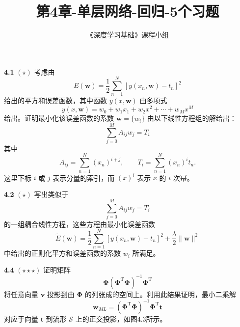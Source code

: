 \documentclass{article}
\title{第4章-单层网络-回归-5个习题}
\author{《深度学习基础》课程小组}
\begin{document}
\maketitle

\textbf{4.1} $(\star)$ 考虑由
\begin{equation}
E(\mathbf{w}) = \frac{1}{2} \sum\limits_{n=1}^{N} \left[ y(x_n,\mathbf{w})-t_n \right]^2
\tag{1.2}
\end{equation}
给出的平方和误差函数，其中函数 $y(x, \mathbf{w})$ 由多项式
\begin{equation}
y(x, \mathbf{w}) = w_0 + w_1x_1 + w_2x^2 + \cdots + w_Mx^M 
\tag{1.1}
\end{equation}
给出。证明最小化该误差函数的系数 $\mathbf{w} = \{w_i\}$ 由以下线性方程组的解给出：
\begin{equation}
\sum_{j=0}^{M} A_{ij} w_j = T_i \tag{4.53}
\end{equation}
其中
\begin{equation}
A_{ij} = \sum_{n=1}^{N} (x_n)^{i+j}, \qquad T_i = \sum_{n=1}^{N} (x_n)^i t_n. \tag{4.54}
\end{equation}
这里下标 $i$ 或 $j$ 表示分量的索引，而 $(x)^i$ 表示 $x$ 的 $i$ 次幂。


\textbf{4.2} $(\star)$ 写出类似于
\begin{equation}
\sum_{j=0}^{M} A_{ij} w_j = T_i \tag{4.53}
\end{equation}
的一组耦合线性方程，这些方程由最小化误差函数
\begin{equation}
\tilde{E} (\mathbf{w}) = \frac{1}{2}\sum_{n=1}^{N} \left[ y(x_n,\mathbf{w})-t_n \right]^2 + \frac{\lambda}{2} \lVert \mathbf{w} \rVert^2
\tag{1.4}
\end{equation}
中给出的正则化平方和误差函数的系数 $w_i$ 所满足。


\textbf{4.4} $(\star\star\star)$ 证明矩阵
\begin{equation}
\boldsymbol{\Phi}(\boldsymbol{\Phi}^{\mathrm{T}}\boldsymbol{\Phi})^{-1}\boldsymbol{\Phi}^{\mathrm{T}} \tag{4.59}
\end{equation}
将任意向量 $\mathbf{v}$ 投影到由 $\boldsymbol{\Phi}$ 的列张成的空间上。利用此结果证明，最小二乘解
\begin{equation}
\mathbf{w}_{ML} = (\boldsymbol{\Phi}^{\mathrm{T}}\boldsymbol{\Phi})^{-1}\boldsymbol{\Phi}^{\mathrm{T}} \mathbf{t} \tag{4.14}
\end{equation}
对应于向量 $\mathbf{t}$ 到流形 $\mathcal{S}$ 上的正交投影，如图4.3所示。
\end{document}
